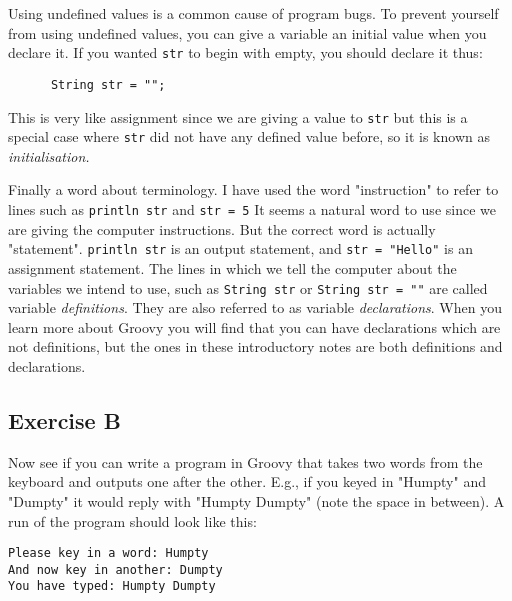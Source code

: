Using undefined values is a common cause of program
bugs.  %
%
To prevent yourself from using undefined values, you can give a variable
an initial value when you declare it.  If you wanted \verb!str! to begin
with empty, you should declare it thus:

\begin{Verbatim}
      String str = "";
\end{Verbatim}

This is very like assignment since we are giving a value to \verb!str! but
this is a special case where \verb!str! did not have any defined value before,
so it is known as \emph{initialisation.}

Finally a word about terminology.  I have used the word "instruction"
to refer to lines such as \verb!println str! and \verb!str = 5!
It seems a natural word to use since we are giving the computer instructions.
But the correct word is actually "statement".  \verb!println str! is
an output statement, and \verb!str = "Hello"! is an assignment statement.
The lines in which we tell the computer about the variables we intend to
use, such as \verb!String str! or \verb!String str = ""! are called
variable \emph{definitions}.  They are also referred to as 
variable \emph{declarations}.  When you learn more about Groovy you will
find that you can have declarations which are not definitions, but the
ones in these introductory notes are both definitions and declarations.

\subsection*{Exercise B}

Now see if you can write a program in Groovy that takes
two words from the keyboard and outputs one after the other. E.g., if
you keyed in "Humpty" and "Dumpty" 
it would reply with "Humpty Dumpty" (note the space in between).
A run of the program should look like this:
\begin{Verbatim}
Please key in a word: Humpty
And now key in another: Dumpty
You have typed: Humpty Dumpty
\end{Verbatim}


 	

